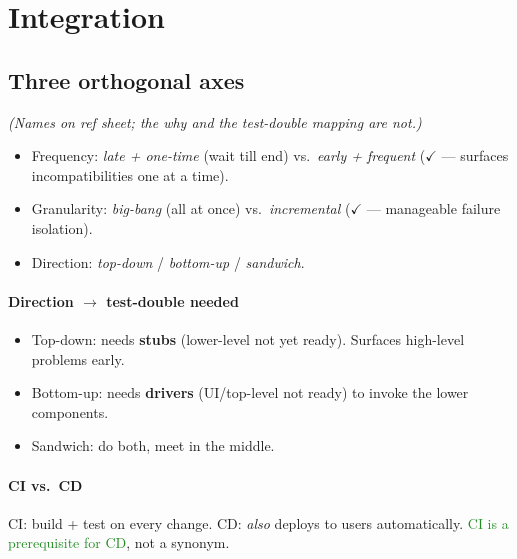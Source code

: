 \section{Integration}

\subsection{Three orthogonal axes}
\textit{(Names on ref sheet; the why and the test-double mapping are not.)}
\begin{itemize}
  \item \textcolor{Bittersweet}{Frequency}: \emph{late + one-time} (wait till end) vs.\ \emph{early + frequent} ($\checkmark$ — surfaces incompatibilities one at a time).
  \item \textcolor{Bittersweet}{Granularity}: \emph{big-bang} (all at once) vs.\ \emph{incremental} ($\checkmark$ — manageable failure isolation).
  \item \textcolor{Bittersweet}{Direction}: \emph{top-down} / \emph{bottom-up} / \emph{sandwich}.
\end{itemize}

\paragraph{Direction $\to$ test-double needed}
\begin{itemize}
  \item \textcolor{Bittersweet}{Top-down}: needs \textbf{stubs} (lower-level not yet ready). Surfaces high-level problems early.
  \item \textcolor{Bittersweet}{Bottom-up}: needs \textbf{drivers} (UI/top-level not ready) to invoke the lower components.
  \item \textcolor{Bittersweet}{Sandwich}: do both, meet in the middle.
\end{itemize}

\paragraph{CI vs.\ CD} \textcolor{Bittersweet}{CI}: build + test on every change. \textcolor{Bittersweet}{CD}: \emph{also} deploys to users automatically. \textcolor{ForestGreen}{CI is a prerequisite for CD}, not a synonym.
